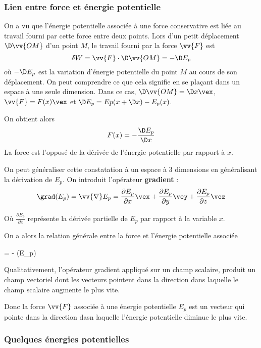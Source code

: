 \documentclass{cours}
\begin{document}
\subsubsection{Lien entre force et énergie potentielle}%
\label{ssub:lien_entre_force_et_energie_potentielle}
On a vu que l'énergie potentielle associée à une force conservative est liée au travail fourni par cette force entre deux points. Lors d'un petit déplacement $\D\vv{OM}$ d'un point $M$, le travail fourni par la force $\vv{F}$ est 
\begin{equation}
  \delta W = \vv{F}\cdot\D\vv{OM} = -\D E_p
\end{equation}
où $-\D E_p$ est la variation d'énergie potentielle du point $M$ au cours de son déplacement. On peut comprendre ce que cela signifie en se plaçant dans un espace à une seule dimension. Dans ce cas, $\D \vv{OM} = \D x \vex $, $\vv{F} = F(x) \vex $ et $\D E_p = Ep(x+\D x) - E_p(x)$.   

On obtient alors
\begin{equation}
  F(x) = - \frac{\D E_p}{\D x}
\end{equation}
La force est l'opposé de la dérivée de l'énergie potentielle par rapport à $x$. 

On peut généraliser cette constatation à un espace à 3 dimensions en généralisant la dérivation de $E_p$. On introduit l'opérateur \textbf{gradient} :
\begin{equation}
  \grad (E_p) = \vv{\nabla} E_p = \frac{\partial E_p}{\partial x}\vex +  \frac{\partial E_p}{\partial y}\vey +\frac{\partial E_p}{\partial z}\vez 
\end{equation}

Où $\frac{\partial E_p}{\partial x}$ représente la dérivée partielle de $E_p$ par rapport à la variable $x$. 

On a alors la relation générale entre la force et l'énergie potentielle associée 
\begin{eqencadre}
   = - \grad(E_p)
\end{eqencadre}

Qualitativement, l'opérateur gradient appliqué sur un champ scalaire, produit un champ vectoriel dont les vecteurs pointent dans la direction dans laquelle le champ scalaire augmente le plus vite.

Donc la force $\vv{F}$ associée à une énergie potentielle $E_p$ est un vecteur qui pointe dans la direction dasn laquelle l'énergie potentielle diminue le plus vite.

\subsubsection{Quelques énergies potentielles}%
\label{ssub:quelques_energies_potentielles}
\end{document}

